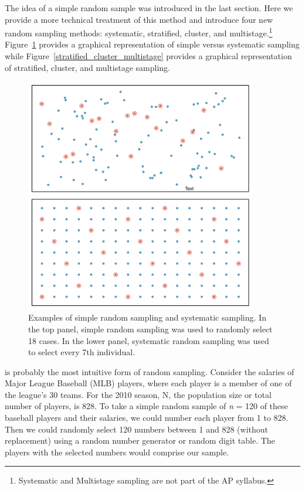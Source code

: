The idea of a simple random sample was introduced in the last section. Here we provide a more technical treatment of this method and introduce four new random sampling methods: systematic, stratified, cluster, and multistage.\footnote{Systematic and Multistage sampling are not part of the AP syllabus.} Figure~\ref{simple_systematic} provides a graphical representation of simple versus systematic sampling while Figure~\ref{stratified_cluster_multistage} provides a graphical representation of stratified, cluster, and multistage sampling.


\begin{figure}
\centering
\includegraphics[width=0.9\textwidth]{ch_data_collection/figures/samplingMethodsFigure/simple_systematic}
\caption{Examples of simple random sampling and systematic sampling. In the top panel, simple random sampling was used to randomly select 18 cases. In the lower panel, systematic random sampling was used to select every 7th individual.}
\label{simple_systematic}
\end{figure}

 is probably the most intuitive form of random sampling. Consider the salaries of Major League Baseball (MLB) players, where each player is a member of one of the league's 30 teams. For the 2010 season, N, the population size or total number of players, is 828. To take a simple random sample of \textit{n} = 120 of these baseball players and their salaries, we could number each player from 1 to 828. Then we could randomly select 120 numbers between 1 and 828 (without replacement) using a random number generator or random digit table. The players with the selected numbers would comprise our sample.

